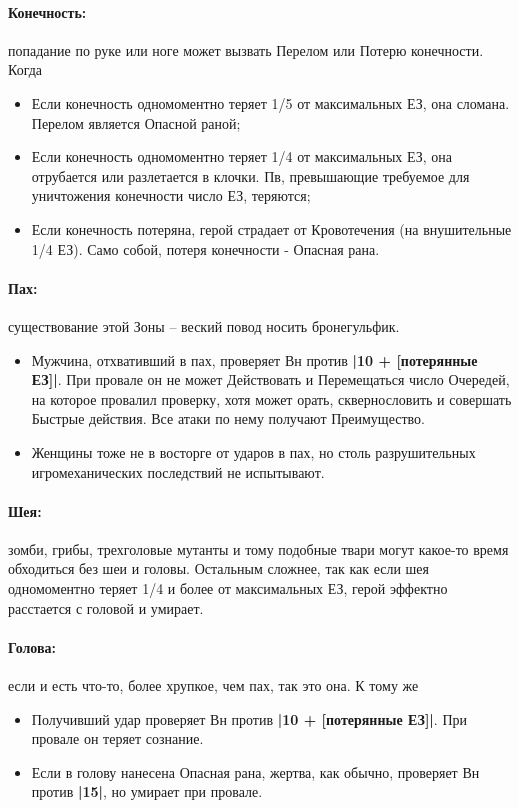 \paragraph{Конечность:} попадание по руке или ноге может вызвать Перелом или Потерю конечности. Когда
\begin{itemize}
  \item Если конечность одномоментно теряет 1/5 от максимальных ЕЗ, она сломана. Перелом является Опасной раной;
  \item Если конечность одномоментно теряет  1/4 от максимальных ЕЗ, она отрубается или разлетается в клочки. Пв, превышающие требуемое для уничтожения конечности число ЕЗ, теряются;
  \item Если конечность потеряна, герой страдает от Кровотечения (на внушительные 1/4 ЕЗ). Само собой, потеря конечности - Опасная рана.
\end{itemize}
\paragraph{Пах:} существование этой Зоны – веский повод носить бронегульфик.
\begin{itemize}
  \item Мужчина, отхвативший в пах, проверяет Вн против \textbf{|10 + [потерянные ЕЗ]|}. При провале он не может Действовать и Перемещаться число Очередей, на которое провалил проверку, хотя может орать, сквернословить и совершать Быстрые действия. Все атаки по нему получают Преимущество.
  \item Женщины тоже не в восторге от ударов в пах, но столь разрушительных игромеханических последствий не испытывают. 
\end{itemize}
\paragraph{Шея:} зомби, грибы, трехголовые мутанты и тому подобные твари могут какое-то время обходиться без шеи и головы.
\newline Остальным сложнее, так как если шея одномоментно теряет 1/4 и более от максимальных ЕЗ, герой эффектно расстается с головой и умирает.
\paragraph{Голова:} если и есть что-то, более хрупкое, чем пах, так это она. К тому же
\begin{itemize}
  \item Получивший удар проверяет Вн против \textbf{|10 + [потерянные ЕЗ]|}. При провале он теряет сознание.
  \item Если в голову нанесена Опасная рана, жертва, как обычно, проверяет Вн против \textbf{|15|}, но умирает при провале.
\end{itemize}
